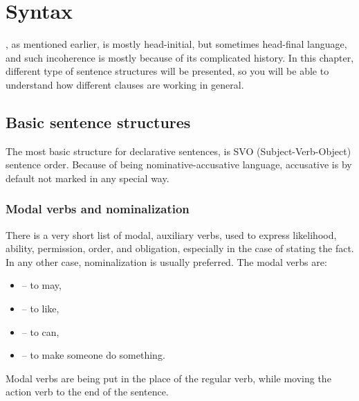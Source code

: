 \chapter{Syntax}
\label{ch:syntax}

\andro, as mentioned earlier, is mostly head-initial, but sometimes head-final
language, and such incoherence is mostly because of its complicated history. In
this chapter, different type of sentence structures will be presented, so you
will be able to understand how different clauses are working in general.

\section{Basic sentence structures}
\label{sec:basic}

The most basic structure for declarative sentences, is SVO (Subject-Verb-Object)
sentence order. Because of being nominative-accusative language, accusative is
by default not marked in any special way.


\subsection{Modal verbs and nominalization}

There is a very short list of modal, auxiliary verbs, used to express
likelihood, ability, permission, order, and obligation, especially in the case
of stating the fact. In any other case, nominalization is usually preferred. The
modal verbs are:

\begin{itemize}
    \item {} -- to may,
    \item {} -- to like,
    \item {} -- to can,
    \item {} -- to make someone do something.
\end{itemize}



Modal verbs are being put in the place of the regular verb, while moving the
action verb to the end of the sentence.

